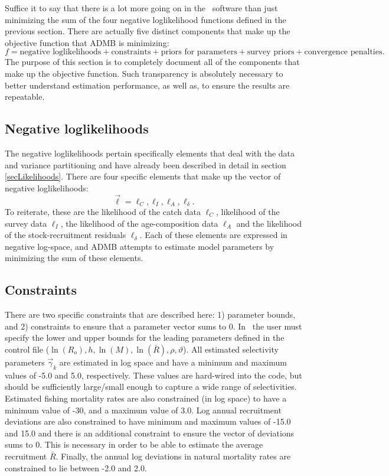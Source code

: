 Suffice it to say that there is a lot more going on in the \iscam\ software than just minimizing the sum of the four negative loglikelihood functions defined in the previous section.  There are actually five distinct components that make up the objective function that ADMB is minimizing:
\[
f = \mbox{negative loglikelihoods}+\mbox{constraints}+\mbox{priors for parameters}+\mbox{survey priors}+\mbox{convergence penalties}.
\]
The purpose of this section is to completely document all of the components that make up the objective function.  Such transparency is absolutely necessary to better understand estimation performance, as well as, to ensure the results are repeatable.

\subsection{Negative loglikelihoods}
	The negative loglikelihoods pertain specifically elements that deal with the data and variance partitioning and have already been described in detail in section \ref{secLikelihoods}.  There are four specific elements that make up the vector of negative loglikelihoods:
\begin{equation}\label{eq11}
	\vec{\ell}=\ell_C, \ell_I, \ell_A, \ell_\delta.
\end{equation}
To reiterate, these are the likelihood of the catch data $\ell_C$, likelihood of the survey data $\ell_I$, the likelihood of the age-composition data $\ell_A$ and the likelihood of the stock-recruitment residuals $\ell_\delta$.  Each of these elements are expressed in negative log-space, and ADMB attempts to estimate model parameters by minimizing the sum of these elements.

\subsection{Constraints}
There are two specific constraints that are described here: 1) parameter bounds, and 2) constraints to ensure that a parameter vector sums to 0.  In \iscam\ the user must specify the lower and upper bounds for the leading parameters defined in the control file ($\ln(R_o),h,\ln(M),\ln(\bar{R}),\rho,\vartheta$).  All estimated selectivity parameters $\vec{\gamma}_k$ are estimated in log space and have a minimum and maximum values of -5.0 and 5.0, respectively.  These values are hard-wired into the code, but should be sufficiently large/small enough to capture a wide range of selectivities.  Estimated fishing mortality rates are also constrained (in log space) to have a minimum value of -30, and a maximum value of 3.0. Log annual recruitment deviations are also constrained to have minimum and maximum values of -15.0 and 15.0 and there is an additional constraint to ensure the vector of deviations sums to 0. This is necessary in order to be able to estimate the average recruitment $\bar{R}$. Finally, the annual log deviations in natural mortality rates are constrained to lie between -2.0 and 2.0.

